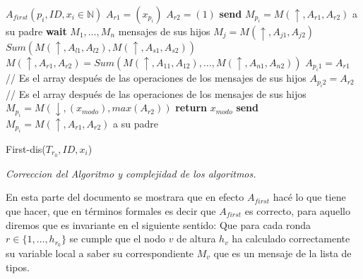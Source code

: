 \documentclass[11pt]{article}
\begin{document}
\begin{algorithm}
\begin{algorithmic}
    \STATE $A_{first}( p_{i}, ID, x_{i} \in \mathbb{N})$
      \STATE $A_{r1} = (x_{p_{i}})$
      \STATE $A_{r2} = (1)$
      \STATE \textbf{send} $M_{p_{i}} = M(\uparrow, A_{r1}, A_{r2})$ a su padre
    \ELSE
      \STATE \textbf{wait} $M_{1},\dots,M_{n}$ mensajes de sus hijos
      \STATE  $M_{j} = M(\uparrow, A_{j1}, A_{j2})$
        \STATE $Sum(M(\uparrow, A_{l1}, A_{l2}), M(\uparrow, A_{s1}, A_{s2}))$
      \ENDFOR
      \STATE $M(\uparrow, A_{r1}, A_{r2}) = Sum(M(\uparrow, A_{11}, A_{12}), \dots, M(\uparrow, A_{n1}, A_{n2})) $
      \STATE $A_{p_{i}1} = A_{r1}$ // Es el array después de las operaciones de los mensajes de sus hijos
      \STATE $A_{p_{i}2} = A_{r2}$ // Es el array después de las operaciones de los mensajes de sus hijos
        \STATE $M_{p_{i}} = M(\downarrow, (x_{modo}), max(A_{r2}))$
        \STATE \textbf{return} $x_{modo}$
      \ELSE
        \STATE \textbf{send} $M_{p_{i}} = M(\uparrow, A_{r1}, A_{r2})$ a su padre
      \ENDIF
    \ENDIF
\end {algorithmic}
\caption{First-dis($T_{r_0},ID,x_{i}$)\label{lss}}
\end{algorithm}

    \newpage
    \begin{center}
        \begin{Large}
            \textit{Correccion del Algoritmo y complejidad de los algoritmos.}
        \end{Large}
    \end{center}

En esta parte del documento se mostrara que en efecto $A_{first}$ hacé lo que tiene que hacer, que en términos
formales es decir que $A_{first}$ es correcto, para aquello diremos que es invariante en el siguiente sentido:\newline
Que para cada ronda $ r \in \lbrace 1,\dots, h_{r_{0}} \rbrace $ se cumple que el nodo $v$ de altura $h_{v}$ ha calculado correctamente
su variable local a saber su correspondiente $M_{v}$ que es un mensaje de la lista de tipos.
\\
\end{document}
